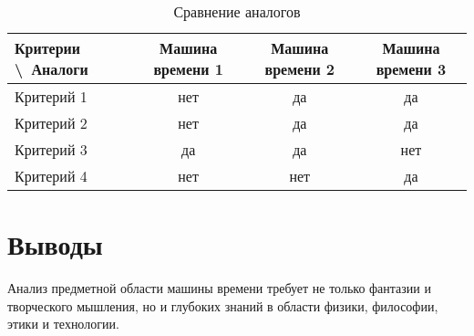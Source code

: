 \begin{table}[ht]
	\Large
	\caption{Сравнение аналогов}
	\label{t:comp-an}
	\centering
	\begin{tabularx}{\textwidth}{|X|c|c|c|}
		\hline
		Критерии \textbackslash\ Аналоги & Машина времени 1 & Машина времени 2 & Машина времени 3 \\
		\hline
		Критерий 1
		                                 & нет              & да               & да               \\
		\hline
		Критерий 2
		                                 & нет              & да               & да               \\
		\hline
		Критерий 3
		                                 & да               & да               & нет              \\
		\hline
		Критерий 4
		                                 & нет              & нет              & да               \\
		\hline
	\end{tabularx}
\end{table}

\pagebreak

\section*{Выводы}


Анализ предметной области машины времени требует не только фантазии и творческого мышления, но и глубоких знаний в области физики, философии, этики и технологии.


